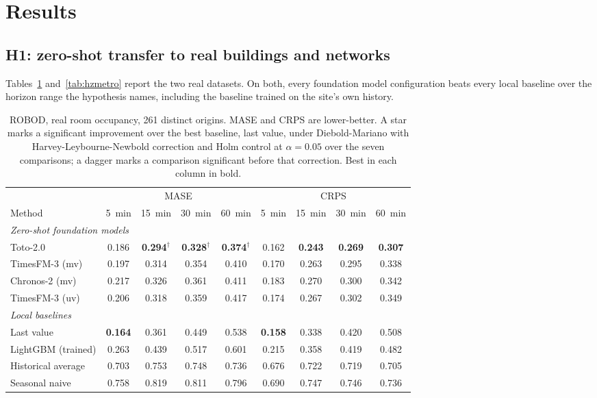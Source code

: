\documentclass[11pt]{article}
\theoremstyle{plain}
\theoremstyle{definition}
\theoremstyle{remark}
\newcommand{\best}[1]{\textbf{#1}}
\begin{document}
\section{Results}
\label{sec:results}

\subsection{H1: zero-shot transfer to real buildings and networks}

Tables~\ref{tab:robod} and~\ref{tab:hzmetro} report the two real datasets. On both, every foundation model configuration beats every local baseline over the horizon range the hypothesis names, including the baseline trained on the site's own history.

\begin{table}[htbp]
\centering
\caption{ROBOD, real room occupancy, \num{261} distinct origins. MASE and CRPS are lower-better. A star marks a significant improvement over the best baseline, last value, under Diebold-Mariano with Harvey-Leybourne-Newbold correction and Holm control at $\alpha=0.05$ over the seven comparisons; a dagger marks a comparison significant before that correction. Best in each column in bold.}
\label{tab:robod}
\small
\begin{tabular}{lcccccccc}
\toprule
& \multicolumn{4}{c}{MASE} & \multicolumn{4}{c}{CRPS} \\
\cmidrule(lr){2-5}\cmidrule(lr){6-9}
Method & \SI{5}{\minute} & \SI{15}{\minute} & \SI{30}{\minute} & \SI{60}{\minute} & \SI{5}{\minute} & \SI{15}{\minute} & \SI{30}{\minute} & \SI{60}{\minute} \\
\midrule
\multicolumn{9}{l}{\emph{Zero-shot foundation models}}\\
Toto-2.0                & 0.186 & \best{0.294}$^{\dagger}$ & \best{0.328}$^{\dagger}$ & \best{0.374}$^{\dagger}$ & 0.162 & \best{0.243} & \best{0.269} & \best{0.307} \\
TimesFM-3 (mv)          & 0.197 & 0.314 & 0.354 & 0.410 & 0.170 & 0.263 & 0.295 & 0.338 \\
Chronos-2 (mv)          & 0.217 & 0.326 & 0.361 & 0.411 & 0.183 & 0.270 & 0.300 & 0.342 \\
TimesFM-3 (uv)          & 0.206 & 0.318 & 0.359 & 0.417 & 0.174 & 0.267 & 0.302 & 0.349 \\
\midrule
\multicolumn{9}{l}{\emph{Local baselines}}\\
Last value              & \best{0.164} & 0.361 & 0.449 & 0.538 & \best{0.158} & 0.338 & 0.420 & 0.508 \\
LightGBM (trained)      & 0.263 & 0.439 & 0.517 & 0.601 & 0.215 & 0.358 & 0.419 & 0.482 \\
Historical average      & 0.703 & 0.753 & 0.748 & 0.736 & 0.676 & 0.722 & 0.719 & 0.705 \\
Seasonal naive          & 0.758 & 0.819 & 0.811 & 0.796 & 0.690 & 0.747 & 0.746 & 0.736 \\
\bottomrule
\end{tabular}
\end{table}
\end{document}
